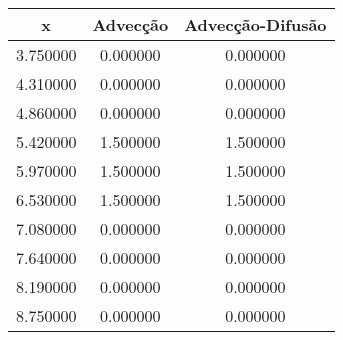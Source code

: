 \begin{tabular}{ccc}
\toprule
x & Advecção & Advecção-Difusão \\
\midrule
3.750000 & 0.000000 & 0.000000 \\
4.310000 & 0.000000 & 0.000000 \\
4.860000 & 0.000000 & 0.000000 \\
5.420000 & 1.500000 & 1.500000 \\
5.970000 & 1.500000 & 1.500000 \\
6.530000 & 1.500000 & 1.500000 \\
7.080000 & 0.000000 & 0.000000 \\
7.640000 & 0.000000 & 0.000000 \\
8.190000 & 0.000000 & 0.000000 \\
8.750000 & 0.000000 & 0.000000 \\
\bottomrule
\end{tabular}
